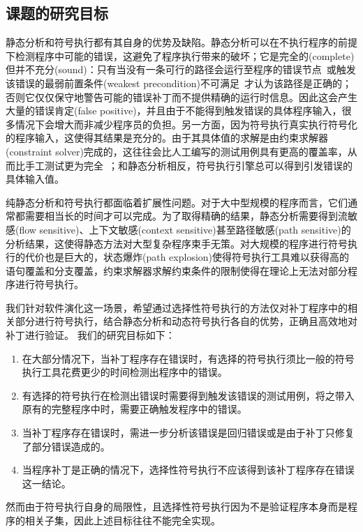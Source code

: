 \subsection{课题的研究目标}
\label{sec:goal}

静态分析和符号执行都有其自身的优势及缺陷。静态分析可以在不执行程序的前提下检测程序中可能的错误，这避免了程序执行带来的破坏；它是完全的(complete)但并不充分(sound)：只有当没有一条可行的路径会运行至程序的错误节点~或触发该错误的最弱前置条件(weakest precondition)不可满足~才认为该路径是正确的；否则它仅仅保守地警告可能的错误补丁而不提供精确的运行时信息。因此这会产生大量的错误肯定(false positive)，并且由于不能得到触发错误的具体程序输入，很多情况下会增大而非减少程序员的负担。另一方面，因为符号执行真实执行符号化的程序输入，这使得其结果是充分的。由于其具体值的求解是由约束求解器(constraint solver)完成的，这往往会比人工编写的测试用例具有更高的覆盖率，从而比手工测试更为完全~；和静态分析相反，符号执行引擎总可以得到引发错误的具体输入值。

纯静态分析和符号执行都面临着扩展性问题。对于大中型规模的程序而言，它们通常都需要相当长的时间才可以完成。为了取得精确的结果，静态分析需要得到流敏感(flow sensitive)、上下文敏感(context sensitive)甚至路径敏感(path sensitive)的分析结果，这使得静态方法对大型复杂程序束手无策。对大规模的程序进行符号执行的代价也是巨大的，状态爆炸(path explosion)使得符号执行工具难以获得高的语句覆盖和分支覆盖，约束求解器求解约束条件的限制使得在理论上无法对部分程序进行符号执行。

我们针对软件演化这一场景，希望通过选择性符号执行的方法仅对补丁程序中的相关部分进行符号执行，结合静态分析和动态符号执行各自的优势，正确且高效地对补丁进行验证。
我们的研究目标如下：
\begin{enumerate}
\item 在大部分情况下，当补丁程序存在错误时，有选择的符号执行须比一般的符号执行工具花费更少的时间检测出程序中的错误。
\item 有选择的符号执行在检测出错误时需要得到触发该错误的测试用例，将之带入原有的完整程序中时，需要正确触发程序中的错误。
\item 当补丁程序存在错误时，需进一步分析该错误是回归错误或是由于补丁只修复了部分错误造成的。
\item 当程序补丁是正确的情况下，选择性符号执行不应该得到该补丁程序存在错误这一结论。
\end{enumerate}

然而由于符号执行自身的局限性，且选择性符号执行因为不是验证程序本身而是程序的相关子集，因此上述目标往往不能完全实现。

